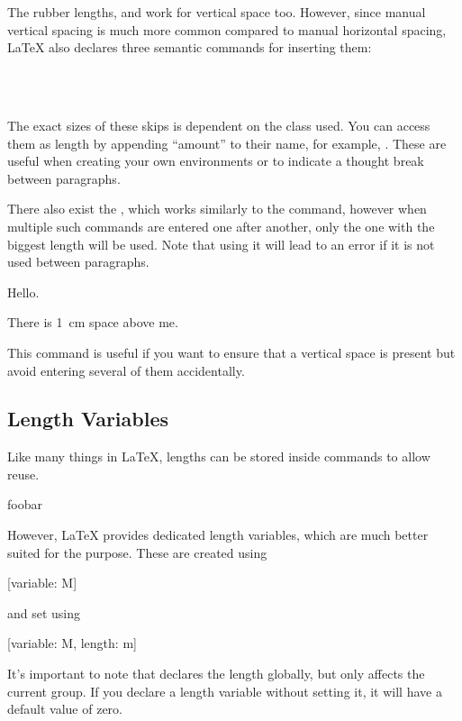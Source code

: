 The rubber lengths,  and  work for vertical space too. However, since manual vertical spacing is
much more common compared to manual horizontal spacing, \LaTeX{} also declares
three semantic commands for inserting them:
\begin{lscommand}
   \\
   \\
\end{lscommand}
The exact sizes of these skips is dependent on the class used. You can access
them as length by appending \enquote{amount} to their name, for example,
. These are useful when creating your own environments or to
indicate a thought break between paragraphs.

There also exist the , which works similarly to the
 command, however when multiple such commands are entered one after
another, only the one with the biggest length will be used. Note that using it
will lead to an error if it is not used between paragraphs.
\begin{example}
Hello.

\addvspace{1pt}
\addvspace{1em}
\addvspace{1cm}
There is \qty{1}{\cm} space
above me.
\end{example}
This command is useful if you want to ensure that a vertical space is present
but avoid entering several of them accidentally.

\subsection{Length Variables}

Like many things in \LaTeX, lengths can be stored inside commands to allow
reuse.
\begin{example}
\NewDocumentCommand{%
  \mylength}{}{2em}
foo\hspace{\mylength}bar
\end{example}
However, \LaTeX{} provides dedicated length variables, which are much better
suited for the purpose. These are created using
\begin{lscommand}
  [variable: M]
\end{lscommand}
and set using
\begin{lscommand}
  [variable: M, length: m]
\end{lscommand}
It's important to note that  declares the length globally, but
 only affects the current group. If you declare a length
variable without setting it, it will have a default value of zero.

